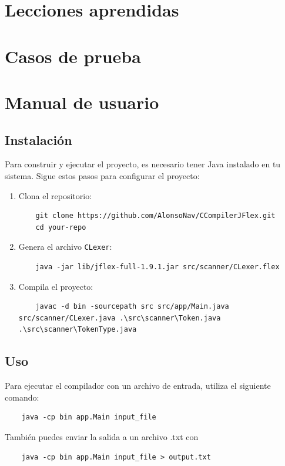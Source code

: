 \documentclass[a4paper,12pt]{article}
\begin{document}
\section*{Lecciones aprendidas}

\section*{Casos de prueba}

\section*{Manual de usuario}
\subsection*{Instalación}
Para construir y ejecutar el proyecto, es necesario tener Java instalado en tu sistema. Sigue estos pasos para configurar el proyecto:

\begin{enumerate}
    \item Clona el repositorio:
    \begin{verbatim}
    git clone https://github.com/AlonsoNav/CCompilerJFlex.git
    cd your-repo
    \end{verbatim}

    \item Genera el archivo \texttt{CLexer}:
    \begin{verbatim}
    java -jar lib/jflex-full-1.9.1.jar src/scanner/CLexer.flex
    \end{verbatim}

    \item Compila el proyecto:
    \begin{verbatim}
    javac -d bin -sourcepath src src/app/Main.java src/scanner/CLexer.java .\src\scanner\Token.java .\src\scanner\TokenType.java 
    \end{verbatim}
\end{enumerate}

\subsection*{Uso}
Para ejecutar el compilador con un archivo de entrada, utiliza el siguiente comando:
\begin{verbatim}
    java -cp bin app.Main input_file
\end{verbatim}
También puedes enviar la salida a un archivo .txt con
\begin{verbatim}
    java -cp bin app.Main input_file > output.txt
\end{verbatim}
\end{document}
